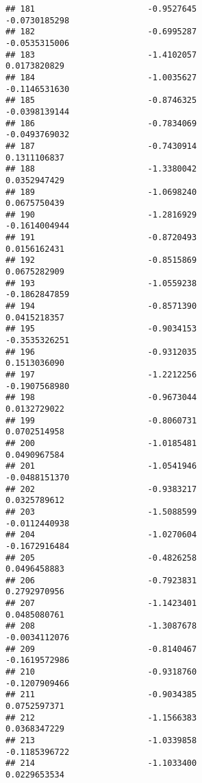\documentclass[
]{article}
\begin{document}
\begin{verbatim}
## 181                       -0.9527645                         -0.0730185298
## 182                       -0.6995287                         -0.0535315006
## 183                       -1.4102057                          0.0173820829
## 184                       -1.0035627                         -0.1146531630
## 185                       -0.8746325                         -0.0398139144
## 186                       -0.7834069                         -0.0493769032
## 187                       -0.7430914                          0.1311106837
## 188                       -1.3380042                          0.0352947429
## 189                       -1.0698240                          0.0675750439
## 190                       -1.2816929                         -0.1614004944
## 191                       -0.8720493                          0.0156162431
## 192                       -0.8515869                          0.0675282909
## 193                       -1.0559238                         -0.1862847859
## 194                       -0.8571390                          0.0415218357
## 195                       -0.9034153                         -0.3535326251
## 196                       -0.9312035                          0.1513036090
## 197                       -1.2212256                         -0.1907568980
## 198                       -0.9673044                          0.0132729022
## 199                       -0.8060731                          0.0702514958
## 200                       -1.0185481                          0.0490967584
## 201                       -1.0541946                         -0.0488151370
## 202                       -0.9383217                          0.0325789612
## 203                       -1.5088599                         -0.0112440938
## 204                       -1.0270604                         -0.1672916484
## 205                       -0.4826258                          0.0496458883
## 206                       -0.7923831                          0.2792970956
## 207                       -1.1423401                          0.0485080761
## 208                       -1.3087678                         -0.0034112076
## 209                       -0.8140467                         -0.1619572986
## 210                       -0.9318760                         -0.1207909466
## 211                       -0.9034385                          0.0752597371
## 212                       -1.1566383                          0.0368347229
## 213                       -1.0339858                         -0.1185396722
## 214                       -1.1033400                          0.0229653534

\end{verbatim}
\end{document}
